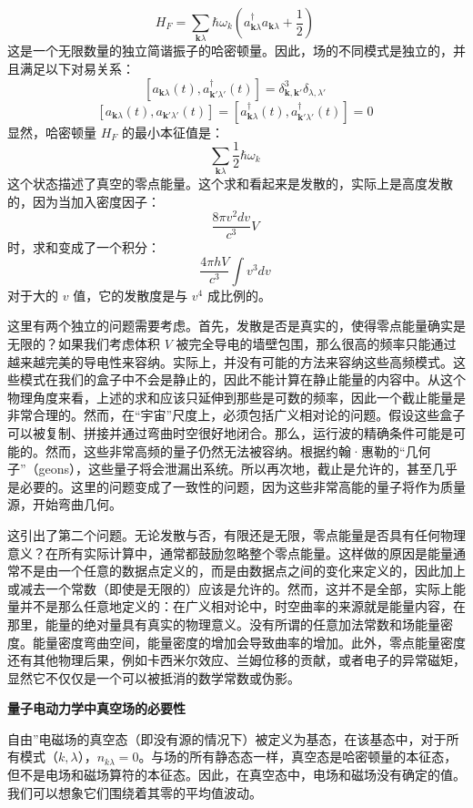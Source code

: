 \[
H_F = \sum_{\mathbf{k} \lambda} \hbar \omega_k \left( a_{\mathbf{k} \lambda}^\dagger a_{\mathbf{k} \lambda} + \frac{1}{2} \right)~
\]
这是一个无限数量的独立简谐振子的哈密顿量。因此，场的不同模式是独立的，并且满足以下对易关系：
\[
[a_{\mathbf{k} \lambda}(t), a_{\mathbf{k'} \lambda'}^\dagger(t)] = \delta_{\mathbf{k}, \mathbf{k'}}^3 \delta_{\lambda, \lambda'}~
\]
\[
[a_{\mathbf{k} \lambda}(t), a_{\mathbf{k'} \lambda'}(t)] = [a_{\mathbf{k} \lambda}^\dagger(t), a_{\mathbf{k'} \lambda'}^\dagger(t)] = 0~
\]
显然，哈密顿量 \( H_F \) 的最小本征值是：
\[
\sum_{\mathbf{k} \lambda} \frac{1}{2} \hbar \omega_k~
\]
这个状态描述了真空的零点能量。这个求和看起来是发散的，实际上是高度发散的，因为当加入密度因子：
\[
\frac{8\pi v^2 dv}{c^3} V~
\]
时，求和变成了一个积分：
\[
\frac{4\pi h V}{c^3} \int v^3 dv~
\]
对于大的 \( v \) 值，它的发散度是与 \( v^4 \) 成比例的。

这里有两个独立的问题需要考虑。首先，发散是否是真实的，使得零点能量确实是无限的？如果我们考虑体积 \(V\) 被完全导电的墙壁包围，那么很高的频率只能通过越来越完美的导电性来容纳。实际上，并没有可能的方法来容纳这些高频模式。这些模式在我们的盒子中不会是静止的，因此不能计算在静止能量的内容中。从这个物理角度来看，上述的求和应该只延伸到那些是可数的频率，因此一个截止能量是非常合理的。然而，在“宇宙”尺度上，必须包括广义相对论的问题。假设这些盒子可以被复制、拼接并通过弯曲时空很好地闭合。那么，运行波的精确条件可能是可能的。然而，这些非常高频的量子仍然无法被容纳。根据约翰·惠勒的“几何子”（geons），这些量子将会泄漏出系统。所以再次地，截止是允许的，甚至几乎是必要的。这里的问题变成了一致性的问题，因为这些非常高能的量子将作为质量源，开始弯曲几何。

这引出了第二个问题。无论发散与否，有限还是无限，零点能量是否具有任何物理意义？在所有实际计算中，通常都鼓励忽略整个零点能量。这样做的原因是能量通常不是由一个任意的数据点定义的，而是由数据点之间的变化来定义的，因此加上或减去一个常数（即使是无限的）应该是允许的。然而，这并不是全部，实际上能量并不是那么任意地定义的：在广义相对论中，时空曲率的来源就是能量内容，在那里，能量的绝对量具有真实的物理意义。没有所谓的任意加法常数和场能量密度。能量密度弯曲空间，能量密度的增加会导致曲率的增加。此外，零点能量密度还有其他物理后果，例如卡西米尔效应、兰姆位移的贡献，或者电子的异常磁矩，显然它不仅仅是一个可以被抵消的数学常数或伪影。

\textbf{量子电动力学中真空场的必要性}

自由”电磁场的真空态（即没有源的情况下）被定义为基态，在该基态中，对于所有模式（\(k, \lambda\)），\(n_{k\lambda} = 0\)。与场的所有静态态一样，真空态是哈密顿量的本征态，但不是电场和磁场算符的本征态。因此，在真空态中，电场和磁场没有确定的值。我们可以想象它们围绕着其零的平均值波动。

